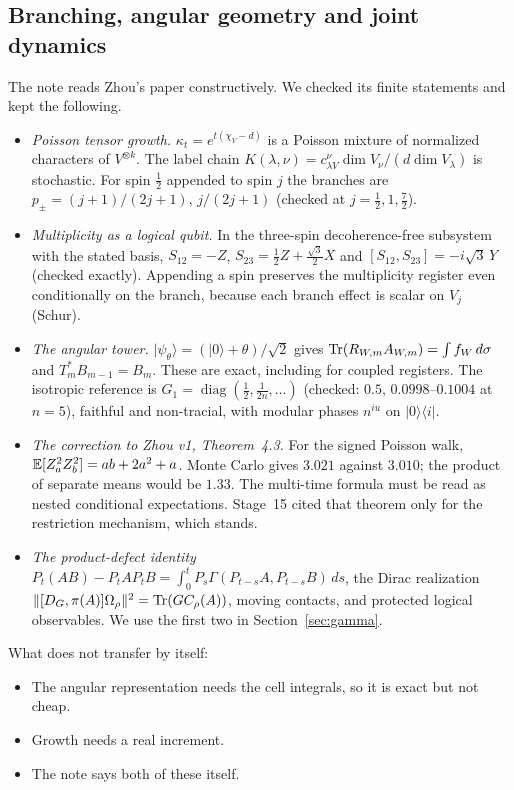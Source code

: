 \label{sec:audit}
\subsection{Branching, angular geometry and joint dynamics}
The note reads Zhou's paper constructively. We checked its finite statements and kept the following.
\begin{itemize}[leftmargin=*]
\item \emph{Poisson tensor growth.} $\kappa_t=e^{t(\chi_V-d)}$ is a Poisson mixture of normalized characters of $V^{\otimes k}$. The label chain
$K(\lambda,\nu)=c^\nu_{\lambda V}\dim V_\nu/(d\dim V_\lambda)$ is stochastic. For spin $\frac12$ appended to spin $j$ the branches are
$p_\pm=(j+1)/(2j+1),\,j/(2j+1)$ (checked at $j=\frac12,1,\frac72$).
\item \emph{Multiplicity as a logical qubit.} In the three-spin decoherence-free subsystem with the stated basis, $S_{12}=-Z$,
$S_{23}=\frac12Z+\frac{\sqrt3}2X$ and $[S_{12},S_{23}]=-i\sqrt3\,Y$ (checked exactly). Appending a spin preserves the multiplicity register even
conditionally on the branch, because each branch effect is scalar on $V_j$ (Schur).
\item \emph{The angular tower.} $|\psi_\theta\rangle=(|0\rangle+\theta)/\sqrt2$ gives $\operatorname{Tr}(R_{W,m}A_{W,m})=\int f_W\,d\sigma$ and $T_m^*B_{m-1}=B_m$. These are exact,
including for coupled registers. The isotropic reference is $G_1=\operatorname{diag}(\frac12,\frac1{2n},\dots)$ (checked: $0.5$, $0.0998$--$0.1004$
at $n=5$), faithful and non-tracial, with modular phases $n^{iu}$ on $|0\rangle\langle i|$.
\item \emph{The correction to Zhou v1, Theorem~4.3.} For the signed Poisson walk, $\mathbb E[Z_a^2Z_b^2]=ab+2a^2+a$. Monte Carlo gives $3.021$ against
$3.010$; the product of separate means would be $1.33$. The multi-time formula must be read as nested conditional expectations. Stage~15
cited that theorem only for the restriction mechanism, which stands.
\item \emph{The product-defect identity} $P_t(AB)-P_tAP_tB=\int_0^tP_s\Gamma(P_{t-s}A,P_{t-s}B)\,ds$, the Dirac realization
$\|[D_G,\pi(A)]\Omega_\rho\|^2=\operatorname{Tr}(GC_\rho(A))$, moving contacts, and protected logical observables. We use the first two in
Section~\ref{sec:gamma}.
\end{itemize}
What does not transfer by itself:
\begin{itemize}[leftmargin=*]
\item The angular representation needs the cell integrals, so it is exact but not cheap.
\item Growth needs a real increment.
\item The note says both of these itself.
\end{itemize}

